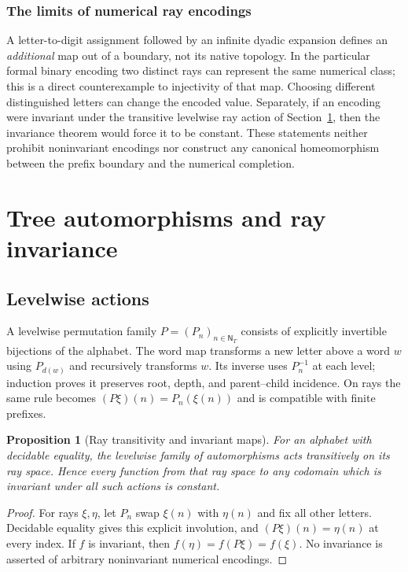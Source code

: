 \documentclass[11pt,reqno]{amsart}
\newtheorem{proposition}[theorem]{Proposition}
\theoremstyle{definition}\newtheorem{definition}[theorem]{Definition}
\theoremstyle{remark}\newtheorem{remark}[theorem]{Remark}
\newcommand{\N}{\mathsf N_T}\newcommand{\Z}{\mathsf Z_T}\newcommand{\Q}{\mathsf Q_T}\newcommand{\RR}{\mathsf R}
\begin{document}
\medskip
\subsubsection*{The limits of numerical ray encodings}\label{supp:10-8}
A letter-to-digit assignment followed by an infinite dyadic expansion defines an \emph{additional} map out of a boundary, not its native topology. In the particular formal binary encoding two distinct rays can represent the same numerical class; this is a direct counterexample to injectivity of that map. Choosing different distinguished letters can change the encoded value. Separately, if an encoding were invariant under the transitive levelwise ray action of Section~\ref{sec:automorphisms}, then the invariance theorem would force it to be constant. These statements neither prohibit noninvariant encodings nor construct any canonical homeomorphism between the prefix boundary and the numerical completion.
\medskip

\clearpage
\section{Tree automorphisms and ray invariance}\label{sec:automorphisms}
\subsection{Levelwise actions}\label{main:sub-38}
A levelwise permutation family $P=(P_n)_{n\in\N}$ consists of explicitly invertible bijections of the alphabet. The word map transforms a new letter above a word $w$ using $P_{d(w)}$ and recursively transforms $w$. Its inverse uses $P_n^{-1}$ at each level; induction proves it preserves root, depth, and parent--child incidence. On rays the same rule becomes $(P\xi)(n)=P_n(\xi(n))$ and is compatible with finite prefixes.

\begin{proposition}[Ray transitivity and invariant maps]\label{prop:transitivity}
For an alphabet with decidable equality, the levelwise family of automorphisms acts transitively on its ray space. Hence every function from that ray space to any codomain which is invariant under all such actions is constant.
\end{proposition}
\begin{proof}
For rays $\xi,\eta$, let $P_n$ swap $\xi(n)$ with $\eta(n)$ and fix all other letters. Decidable equality gives this explicit involution, and $(P\xi)(n)=\eta(n)$ at every index. If $f$ is invariant, then $f(\eta)=f(P\xi)=f(\xi)$. No invariance is asserted of arbitrary noninvariant numerical encodings.
\end{proof}
\end{document}
